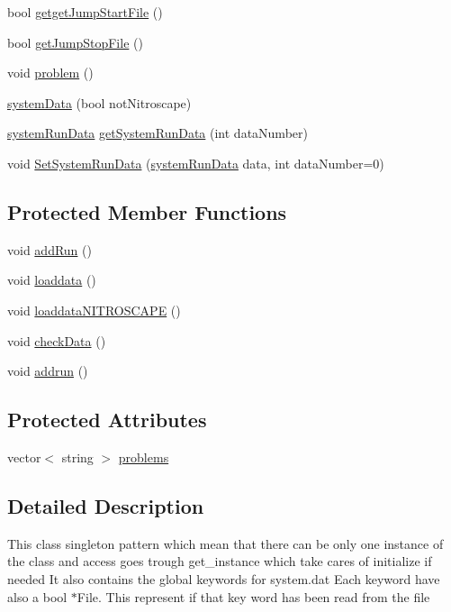 \begin{DoxyCompactItemize}
\item 
bool \hyperlink{classsystem_data_a3e4ff267e71ef0d1b5d8976d2368d205}{getgetJumpStartFile} ()
\item 
bool \hyperlink{classsystem_data_a23122fa1bcf928224cfb9fb5c15d9bcb}{getJumpStopFile} ()
\item 
void \hyperlink{classsystem_data_ac67d97741ebf19dadc1e9b29995213b3}{problem} ()
\item 
\hyperlink{classsystem_data_a2aa6ac7104d8b19fabd199b0c55dd0f5}{systemData} (bool notNitroscape)
\item 
\hyperlink{classsystem_run_data}{systemRunData} \hyperlink{classsystem_data_acc68bd4d62dec9467efc7628814935b4}{getSystemRunData} (int dataNumber)
\item 
void \hyperlink{classsystem_data_af821210ac898dc8db3d28214798a7aa0}{SetSystemRunData} (\hyperlink{classsystem_run_data}{systemRunData} data, int dataNumber=0)
\end{DoxyCompactItemize}
\subsection*{Protected Member Functions}
\begin{DoxyCompactItemize}
\item 
void \hyperlink{classsystem_data_aa29d606df487daec256e0626edecc9cb}{addRun} ()
\item 
void \hyperlink{classsystem_data_af7488868863974a44e7a1e6fc21a7542}{loaddata} ()
\item 
void \hyperlink{classsystem_data_a1723df5efc2439253e54e2c3804e999b}{loaddataNITROSCAPE} ()
\item 
void \hyperlink{classsystem_data_ad11a516464effcc5ef9a582534a3e351}{checkData} ()
\item 
void \hyperlink{classsystem_data_a9c1ad6641a931ce8e3e232e61e0b8b32}{addrun} ()
\end{DoxyCompactItemize}
\subsection*{Protected Attributes}
\begin{DoxyCompactItemize}
\item 
vector$<$ string $>$ \hyperlink{classsystem_data_aea46d4c5b4d9b1e9177260f8691d0051}{problems}
\end{DoxyCompactItemize}


\subsection{Detailed Description}
This class singleton pattern which mean that there can be only one instance of the class and access goes trough get\_\-instance which take cares of initialize if needed It also contains the global keywords for system.dat Each keyword have also a bool $\ast$File. This represent if that key word has been read from the file 

